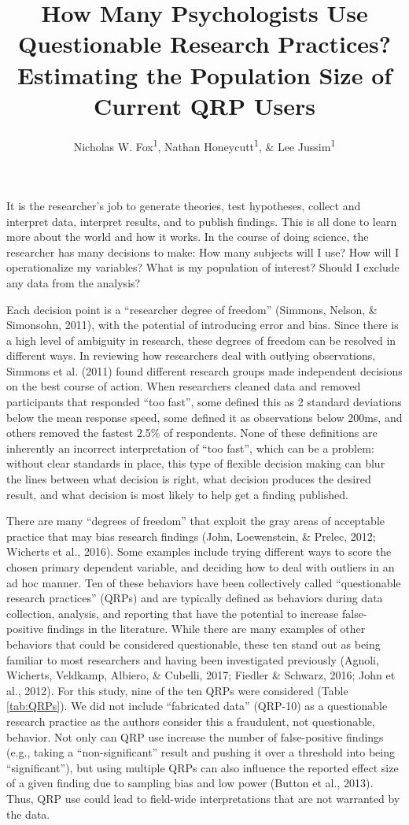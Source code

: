 \documentclass[jou]{apa6}
\title{How Many Psychologists Use Questionable Research Practices? Estimating
the Population Size of Current QRP Users}
\author{Nicholas W. Fox\textsuperscript{1}, Nathan Honeycutt\textsuperscript{1},
\& Lee Jussim\textsuperscript{1}}
\date{}
\affiliation{
\vspace{0.5cm}
\textsuperscript{1} Rutgers University}
\theoremstyle{definition}
\theoremstyle{definition}
\theoremstyle{definition}
\theoremstyle{remark}
\begin{document}
\maketitle

It is the researcher's job to generate theories, test hypotheses,
collect and interpret data, interpret results, and to publish findings.
This is all done to learn more about the world and how it works. In the
course of doing science, the researcher has many decisions to make: How
many subjects will I use? How will I operationalize my variables? What
is my population of interest? Should I exclude any data from the
analysis?

Each decision point is a \enquote{researcher degree of freedom}
(Simmons, Nelson, \& Simonsohn, 2011), with the potential of introducing
error and bias. Since there is a high level of ambiguity in research,
these degrees of freedom can be resolved in different ways. In reviewing
how researchers deal with outlying observations, Simmons et al. (2011)
found different research groups made independent decisions on the best
course of action. When researchers cleaned data and removed participants
that responded \enquote{too fast}, some defined this as 2 standard
deviations below the mean response speed, some defined it as
observations below 200ms, and others removed the fastest 2.5\% of
respondents. None of these definitions are inherently an incorrect
interpretation of \enquote{too fast}, which can be a problem: without
clear standards in place, this type of flexible decision making can blur
the lines between what decision is right, what decision produces the
desired result, and what decision is most likely to help get a finding
published.

There are many \enquote{degrees of freedom} that exploit the gray areas
of acceptable practice that may bias research findings (John,
Loewenstein, \& Prelec, 2012; Wicherts et al., 2016). Some examples
include trying different ways to score the chosen primary dependent
variable, and deciding how to deal with outliers in an ad hoc manner.
Ten of these behaviors have been collectively called
\enquote{questionable research practices} (QRPs) and are typically
defined as behaviors during data collection, analysis, and reporting
that have the potential to increase false-positive findings in the
literature. While there are many examples of other behaviors that could
be considered questionable, these ten stand out as being familiar to
most researchers and having been investigated previously (Agnoli,
Wicherts, Veldkamp, Albiero, \& Cubelli, 2017; Fiedler \& Schwarz, 2016;
John et al., 2012). For this study, nine of the ten QRPs were considered
(Table \ref{tab:QRPs}). We did not include \enquote{fabricated data}
(QRP-10) as a questionable research practice as the authors consider
this a fraudulent, not questionable, behavior. Not only can QRP use
increase the number of false-positive findings (e.g., taking a
\enquote{non-significant} result and pushing it over a threshold into
being \enquote{significant}), but using multiple QRPs can also influence
the reported effect size of a given finding due to sampling bias and low
power (Button et al., 2013). Thus, QRP use could lead to field-wide
interpretations that are not warranted by the data.
\end{document}

